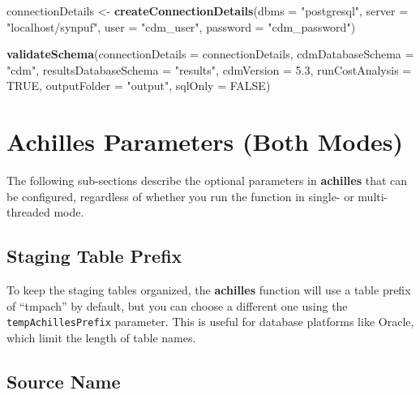 \documentclass[]{article}
\newenvironment{Shaded}{\begin{snugshade}}{\end{snugshade}}
\newcommand{\KeywordTok}[1]{\textcolor[rgb]{0.13,0.29,0.53}{\textbf{#1}}}
\newcommand{\DataTypeTok}[1]{\textcolor[rgb]{0.13,0.29,0.53}{#1}}
\newcommand{\FloatTok}[1]{\textcolor[rgb]{0.00,0.00,0.81}{#1}}
\newcommand{\StringTok}[1]{\textcolor[rgb]{0.31,0.60,0.02}{#1}}
\newcommand{\OtherTok}[1]{\textcolor[rgb]{0.56,0.35,0.01}{#1}}
\newcommand{\NormalTok}[1]{#1}
\begin{document}
\begin{Shaded}
\begin{Highlighting}[]
\NormalTok{connectionDetails <-}\StringTok{ }\KeywordTok{createConnectionDetails}\NormalTok{(}\DataTypeTok{dbms =} \StringTok{"postgresql"}\NormalTok{, }
                                             \DataTypeTok{server =} \StringTok{"localhost/synpuf"}\NormalTok{, }
                                             \DataTypeTok{user =} \StringTok{"cdm_user"}\NormalTok{, }
                                             \DataTypeTok{password =} \StringTok{"cdm_password"}\NormalTok{)}

\KeywordTok{validateSchema}\NormalTok{(}\DataTypeTok{connectionDetails =}\NormalTok{ connectionDetails, }
               \DataTypeTok{cdmDatabaseSchema =} \StringTok{"cdm"}\NormalTok{, }
               \DataTypeTok{resultsDatabaseSchema =} \StringTok{"results"}\NormalTok{, }
               \DataTypeTok{cdmVersion =} \FloatTok{5.3}\NormalTok{, }
               \DataTypeTok{runCostAnalysis =} \OtherTok{TRUE}\NormalTok{, }
               \DataTypeTok{outputFolder =} \StringTok{"output"}\NormalTok{, }
               \DataTypeTok{sqlOnly =} \OtherTok{FALSE}\NormalTok{)}
\end{Highlighting}
\end{Shaded}

\section{Achilles Parameters (Both
Modes)}\label{achilles-parameters-both-modes}

The following sub-sections describe the optional parameters in
\textbf{achilles} that can be configured, regardless of whether you run
the function in single- or multi-threaded mode.

\subsection{Staging Table Prefix}\label{staging-table-prefix}

To keep the staging tables organized, the \textbf{achilles} function
will use a table prefix of ``tmpach'' by default, but you can choose a
different one using the \texttt{tempAchillesPrefix} parameter. This is
useful for database platforms like Oracle, which limit the length of
table names.

\subsection{Source Name}\label{source-name}
\end{document}
